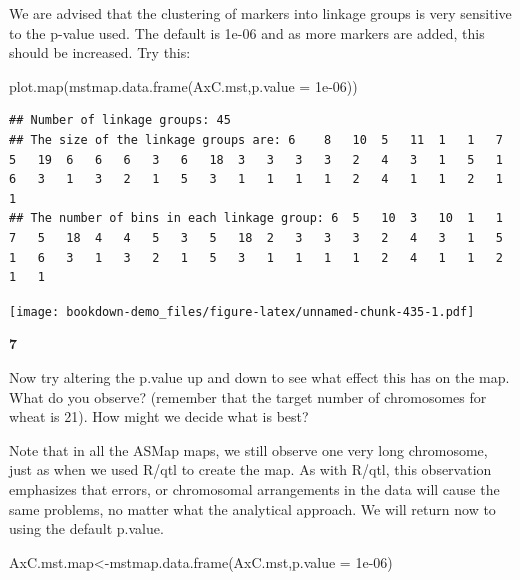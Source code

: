 \documentclass[
]{book}
\makeatletter
\newenvironment{Shaded}{\begin{snugshade}}{\end{snugshade}}
\newcommand{\AttributeTok}[1]{\textcolor[rgb]{0.77,0.63,0.00}{#1}}
\newcommand{\FloatTok}[1]{\textcolor[rgb]{0.00,0.00,0.81}{#1}}
\newcommand{\FunctionTok}[1]{\textcolor[rgb]{0.00,0.00,0.00}{#1}}
\newcommand{\NormalTok}[1]{#1}
\newcommand{\OtherTok}[1]{\textcolor[rgb]{0.56,0.35,0.01}{#1}}
\newenvironment{kframe}{%
\medskip{}
\setlength{\fboxsep}{.8em}
 \def\at@end@of@kframe{}%
 \ifinner\ifhmode%
  \def\at@end@of@kframe{\end{minipage}}%
  \begin{minipage}{\columnwidth}%
 \fi\fi%
 \def\FrameCommand##1{\hskip\@totalleftmargin \hskip-\fboxsep
 \colorbox{shadecolor}{##1}\hskip-\fboxsep
     \hskip-\linewidth \hskip-\@totalleftmargin \hskip\columnwidth}%
 \MakeFramed {\advance\hsize-\width
   \@totalleftmargin\z@ \linewidth\hsize
   \@setminipage}}%
 {\par\unskip\endMakeFramed%
 \at@end@of@kframe}
\newenvironment{rmdblock}[1]
  {
  \begin{itemize}
  \renewcommand{\labelitemi}{
    \raisebox{-.7\height}[0pt][0pt]{
      {\setkeys{Gin}{width=3em,keepaspectratio}\texttt{[image: images/\#1]}}
    }
  }
  \setlength{\fboxsep}{1em}
  \begin{kframe}
  \item
  }
  {
  \end{kframe}
  \end{itemize}
  }
\newenvironment{rmdquiz}
  {\begin{rmdblock}{quiz}}
  {\end{rmdblock}}
\makeatother
\begin{document}
We are advised that the clustering of markers into linkage groups is very sensitive to the p-value used. The default is 1e-06 and as more markers are added, this should be increased. Try this:

\begin{Shaded}
\begin{Highlighting}[]
\FunctionTok{plot.map}\NormalTok{(}\FunctionTok{mstmap.data.frame}\NormalTok{(AxC.mst,}\AttributeTok{p.value =} \FloatTok{1e{-}06}\NormalTok{)) }
\end{Highlighting}
\end{Shaded}

\begin{verbatim}
## Number of linkage groups: 45
## The size of the linkage groups are: 6    8   10  5   11  1   1   7   5   19  6   6   6   3   6   18  3   3   3   3   2   4   3   1   5   1   6   3   1   3   2   1   5   3   1   1   1   1   2   4   1   1   2   1   1   
## The number of bins in each linkage group: 6  5   10  3   10  1   1   7   5   18  4   4   5   3   5   18  2   3   3   3   2   4   3   1   5   1   6   3   1   3   2   1   5   3   1   1   1   1   2   4   1   1   2   1   1   
\end{verbatim}

\texttt{[image: bookdown-demo\_files/figure-latex/unnamed-chunk-435-1.pdf]}

\begin{rmdquiz}
\textbf{7}

Now try altering the p.value up and down to see what effect this has on the map. What do you observe? (remember that the target number of chromosomes for wheat is 21). How might we decide what is best?
\end{rmdquiz}

Note that in all the ASMap maps, we still observe one very long chromosome, just as when we used R/qtl to create the map. As with R/qtl, this observation emphasizes that errors, or chromosomal arrangements in the data will cause the same problems, no matter what the analytical approach. We will return now to using the default p.value.

\begin{Shaded}
\begin{Highlighting}[]
\NormalTok{AxC.mst.map}\OtherTok{\textless{}{-}}\FunctionTok{mstmap.data.frame}\NormalTok{(AxC.mst,}\AttributeTok{p.value =} \FloatTok{1e{-}06}\NormalTok{) }
\end{Highlighting}
\end{Shaded}
\end{document}
